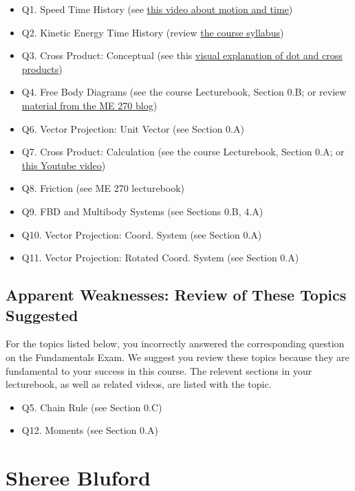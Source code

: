 \documentclass[11pt,letterpaper]{article}\usepackage[]{graphicx}\usepackage[]{color}
\begin{document}
\begin{itemize}\item Q1. Speed Time History (see \href{https://www.youtube.com/watch?v=lZPtFDXYQRU}{this video about motion and time})
\item Q2. Kinetic Energy Time History (review \href{https://www.purdue.edu/freeform/dynamics/wp-content/uploads/sites/4/2018/01/Syllabus-Spring-2018.pdf}{the course syllabus})
\item Q3. Cross Product: Conceptual (see this \href{https://www.youtube.com/watch?v=h0NJK4mEIJU&t=8s}{visual explanation of dot and cross products})
\item Q4. Free Body Diagrams (see the course Lecturebook, Section 0.B; or review \href{https://www.purdue.edu/statics/}{material from the ME 270 blog})
\item Q6. Vector Projection: Unit Vector (see Section 0.A)
\item Q7. Cross Product: Calculation (see the course Lecturebook, Section 0.A; or \href{https://www.youtube.com/watch?v=DmPxjmymM7k}{this Youtube video})
\item Q8. Friction (see ME 270 lecturebook)
\item Q9. FBD and Multibody Systems (see Sections 0.B, 4.A)
\item Q10. Vector Projection: Coord. System (see Section 0.A)
\item Q11. Vector Projection: Rotated Coord. System (see Section 0.A)
\end{itemize}\subsection*{Apparent Weaknesses: Review of These Topics Suggested}
For the topics listed below, you incorrectly answered the corresponding question on the Fundamentals Exam.  We suggest you review these topics because they are fundamental to your success in this course.  The relevent sections in your lecturebook, as well as related videos, are listed with the topic.

\begin{itemize}\item Q5. Chain Rule (see Section 0.C)
\item Q12. Moments (see Section 0.A)
\end{itemize}

\pagebreak
\section*{Sheree Bluford}
\end{document}
